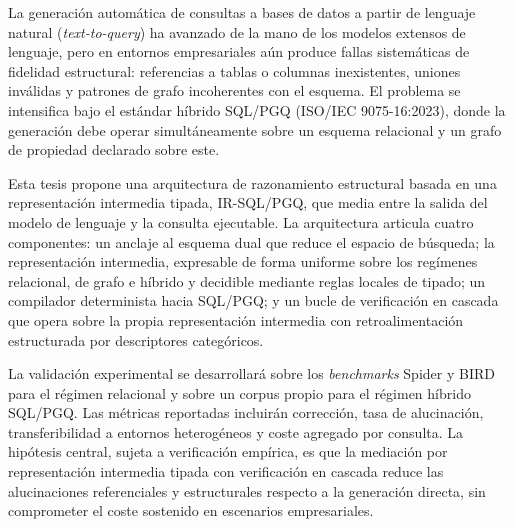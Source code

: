 \begin{resumen}
La generación automática de consultas a bases de datos a partir de lenguaje natural (\emph{text-to-query}) ha avanzado de la mano de los modelos extensos de lenguaje, pero en entornos empresariales aún produce fallas sistemáticas de fidelidad estructural: referencias a tablas o columnas inexistentes, uniones inválidas y patrones de grafo incoherentes con el esquema. El problema se intensifica bajo el estándar híbrido \ac{SQL}/\ac{PGQ} (ISO/IEC 9075-16:2023), donde la generación debe operar simultáneamente sobre un esquema relacional y un grafo de propiedad declarado sobre este.

Esta tesis propone una arquitectura de razonamiento estructural basada en una representación intermedia tipada, IR-SQL/PGQ, que media entre la salida del modelo de lenguaje y la consulta ejecutable. La arquitectura articula cuatro componentes: un anclaje al esquema dual que reduce el espacio de búsqueda; la representación intermedia, expresable de forma uniforme sobre los regímenes relacional, de grafo e híbrido y decidible mediante reglas locales de tipado; un compilador determinista hacia \ac{SQL}/\ac{PGQ}; y un bucle de verificación en cascada que opera sobre la propia representación intermedia con retroalimentación estructurada por descriptores categóricos.

La validación experimental se desarrollará sobre los \emph{benchmarks} Spider y BIRD para el régimen relacional y sobre un corpus propio para el régimen híbrido \ac{SQL}/\ac{PGQ}. Las métricas reportadas incluirán corrección, tasa de alucinación, transferibilidad a entornos heterogéneos y coste agregado por consulta. La hipótesis central, sujeta a verificación empírica, es que la mediación por representación intermedia tipada con verificación en cascada reduce las alucinaciones referenciales y estructurales respecto a la generación directa, sin comprometer el coste sostenido en escenarios empresariales.
\end{resumen}
